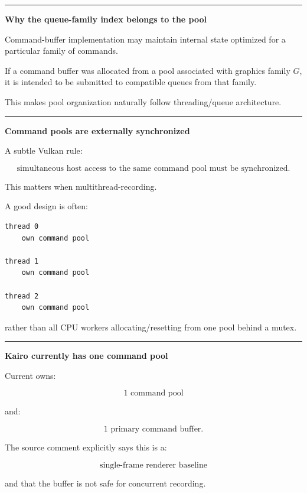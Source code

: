 \begin{center}\rule{0.5\linewidth}{0.5pt}\end{center}

\textbf{Why the queue-family index belongs to the pool}

Command-buffer implementation may maintain internal state optimized for a particular family of commands.

If a command buffer was allocated from a pool associated with graphics family \(G\), it is intended to be submitted to compatible queues from that family.

This makes pool organization naturally follow threading/queue architecture.

\begin{center}\rule{0.5\linewidth}{0.5pt}\end{center}

\textbf{Command pools are externally synchronized}

A subtle Vulkan rule:

\[
\boxed{
\text{simultaneous host access to the same command pool must be synchronized}.
}
\]

This matters when multithread-recording.

A good design is often:

\begin{verbatim}
thread 0
    own command pool

thread 1
    own command pool

thread 2
    own command pool
\end{verbatim}

rather than all CPU workers allocating/resetting from one pool behind a mutex.

\begin{center}\rule{0.5\linewidth}{0.5pt}\end{center}

\textbf{Kairo currently has one command pool}

Current  owns:

\[
1\text{ command pool}
\]

and:

\[
1\text{ primary command buffer}.
\]

The source comment explicitly says this is a:

\[
\boxed{\text{single-frame renderer baseline}}
\]

and that the buffer is not safe for concurrent recording.

